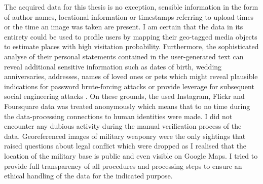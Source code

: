 The acquired data for this thesis is no exception, sensible information in the form of author names, locational information or timestamps referring to upload times or the time an image was taken are present. I am certain that the data in its entirety could be used to profile users by mapping their geo-tagged media objects to estimate places with high visitation probability. Furthermore, the sophisticated analyse of their personal statements contained in the user-generated text can reveal additional sensitive information such as dates of birth, wedding anniversaries, addresses, names of loved ones or pets which might reveal plausible indications for password brute-forcing attacks \parencite{Routh2018} or provide leverage for subsequent social engineering attacks \parencite{Krombholz2015}. On these grounds, the used Instagram, Flickr and Foursquare data was treated anonymously which means that to no time during the data-processing connections to human identities were made. I did not encounter any dubious activity during the manual verification process of the data. Georeferenced images of military weaponry were the only sightings that raised questions about legal conflict which were dropped as I realised that the location of the military base is public and even visible on Google Maps. I tried to provide full transparency of all procedures and processing steps to ensure an ethical handling of the data for the indicated purpose.